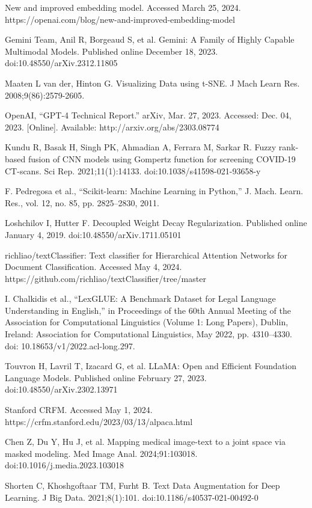 \begin{CJK*}{UTF8}{bkai}
{\begin{thebibliography}{00}
New and improved embedding model. Accessed March 25, 2024. https://openai.com/blog/new-and-improved-embedding-model

Gemini Team, Anil R, Borgeaud S, et al. Gemini: A Family of Highly Capable Multimodal Models. Published online December 18, 2023. doi:10.48550/arXiv.2312.11805

Maaten L van der, Hinton G. Visualizing Data using t-SNE. J Mach Learn Res. 2008;9(86):2579-2605.

OpenAI, “GPT-4 Technical Report.” arXiv, Mar. 27, 2023. Accessed: Dec. 04, 2023. [Online]. Available: http://arxiv.org/abs/2303.08774

Kundu R, Basak H, Singh PK, Ahmadian A, Ferrara M, Sarkar R. Fuzzy rank-based fusion of CNN models using Gompertz function for screening COVID-19 CT-scans. Sci Rep. 2021;11(1):14133. doi:10.1038/s41598-021-93658-y

F. Pedregosa et al., “Scikit-learn: Machine Learning in Python,” J. Mach. Learn. Res., vol. 12, no. 85, pp. 2825–2830, 2011.

Loshchilov I, Hutter F. Decoupled Weight Decay Regularization. Published online January 4, 2019. doi:10.48550/arXiv.1711.05101

richliao/textClassifier: Text classifier for Hierarchical Attention Networks for Document Classification. Accessed May 4, 2024. https://github.com/richliao/textClassifier/tree/master

I. Chalkidis et al., “LexGLUE: A Benchmark Dataset for Legal Language Understanding in English,” in Proceedings of the 60th Annual Meeting of the Association for Computational Linguistics (Volume 1: Long Papers), Dublin, Ireland: Association for Computational Linguistics, May 2022, pp. 4310–4330. doi: 10.18653/v1/2022.acl-long.297.

Touvron H, Lavril T, Izacard G, et al. LLaMA: Open and Efficient Foundation Language Models. Published online February 27, 2023. doi:10.48550/arXiv.2302.13971

Stanford CRFM. Accessed May 1, 2024. https://crfm.stanford.edu/2023/03/13/alpaca.html

Chen Z, Du Y, Hu J, et al. Mapping medical image-text to a joint space via masked modeling. Med Image Anal. 2024;91:103018. doi:10.1016/j.media.2023.103018

Shorten C, Khoshgoftaar TM, Furht B. Text Data Augmentation for Deep Learning. J Big Data. 2021;8(1):101. doi:10.1186/s40537-021-00492-0


\end{thebibliography}}
\end{CJK*}
